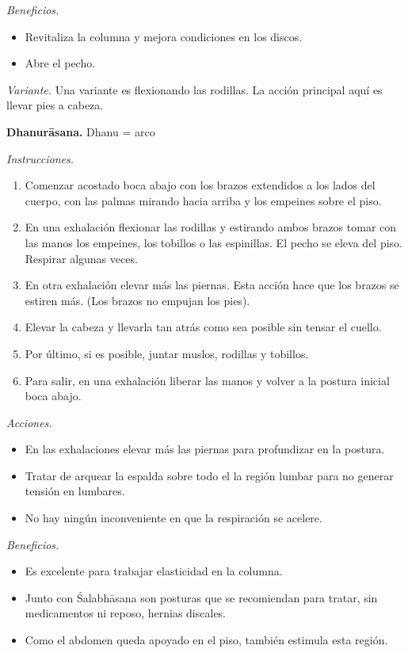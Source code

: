 \emph{Beneficios.}
\begin{itemize}
\item Revitaliza la columna y mejora
condiciones en los discos.
\item Abre el pecho.
\end{itemize}

\emph{Variante.} Una variante es flexionando
las rodillas. La acción principal aquí es
llevar pies a cabeza.

\medskip\noindent\textbf{Dhanurāsana.}
Dhanu = arco

\emph{Instrucciones.}
\begin{enumerate}
\item Comenzar acostado boca abajo con los
brazos extendidos a los lados del cuerpo, con
las palmas mirando hacia arriba y los
empeines sobre el piso.
\item En una exhalación flexionar las
rodillas y estirando ambos brazos tomar con
las manos los empeines, los tobillos o las
espinillas. El pecho se eleva del piso.
Respirar algunas veces.
\item En otra exhalación elevar más las
piernas. Esta acción hace que los brazos se
estiren más. (Los brazos no empujan los
pies).
\item Elevar la cabeza y llevarla tan atrás
como sea posible sin tensar el cuello.
\item Por último, si es posible, juntar
muslos, rodillas y tobillos.
\item Para salir, en una exhalación liberar
las manos y volver a la postura inicial boca
abajo.
\end{enumerate}

\emph{Acciones.}
\begin{itemize}
\item En las exhalaciones elevar más las
piernas para profundizar en la postura.
\item Tratar de arquear la espalda sobre todo
el la región lumbar para no generar tensión
en lumbares.
\item No hay ningún inconveniente en que la
respiración se acelere.
\end{itemize}

\emph{Beneficios.}
\begin{itemize}
\item Es excelente para trabajar elasticidad
en la columna.
\item Junto con Śalabhāsana son posturas que
se recomiendan para tratar, sin medicamentos
ni reposo, hernias discales.
\item Como el abdomen queda apoyado en el
piso, también estimula esta región.
\end{itemize}

